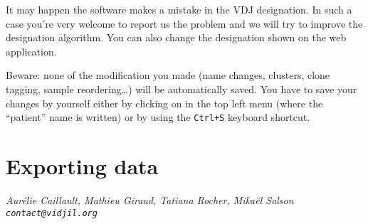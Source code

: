 \documentclass[11pt]{article}
\begin{document}
\bigskip

It may happen the software makes a mistake in the VDJ designation.
In such a case you're very welcome to report us the problem
and we will try to improve the designation algorithm.
You can also change the designation shown on the web application.

Beware: none of the modification you made (name changes, clusters, clone
tagging, sample reordering\dots) will be automatically saved. You have to save
your changes by yourself either by clicking on  in the top left menu (where the
``patient'' name is written) or by using the \texttt{Ctrl+S} keyboard
shortcut.

\section{Exporting data}





\vfill
\flushright \it Aurélie Caillault, Mathieu Giraud, Tatiana Rocher, Mikaël Salson
\\ \texttt{contact@vidjil.org}
\end{document}
